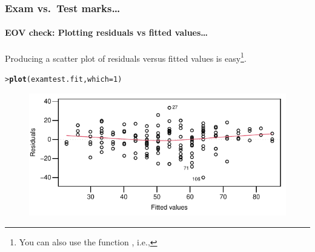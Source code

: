 \documentclass{beamer}\usepackage[]{graphicx}\usepackage[]{xcolor}
\makeatletter
\newcommand{\hlnum}[1]{\textcolor[rgb]{0.686,0.059,0.569}{#1}}%
\newcommand{\hlstd}[1]{\textcolor[rgb]{0.345,0.345,0.345}{#1}}%
\newcommand{\hlkwc}[1]{\textcolor[rgb]{0.333,0.667,0.333}{#1}}%
\newcommand{\hlkwd}[1]{\textcolor[rgb]{0.737,0.353,0.396}{\textbf{#1}}}%
\newenvironment{kframe}{%
 \def\at@end@of@kframe{}%
 \ifinner\ifhmode%
  \def\at@end@of@kframe{\end{minipage}}%
  \begin{minipage}{\columnwidth}%
 \fi\fi%
 \def\FrameCommand##1{\hskip\@totalleftmargin \hskip-\fboxsep
 \colorbox{shadecolor}{##1}\hskip-\fboxsep
     \hskip-\linewidth \hskip-\@totalleftmargin \hskip\columnwidth}%
 \MakeFramed {\advance\hsize-\width
   \@totalleftmargin\z@ \linewidth\hsize
   \@setminipage}}%
 {\par\unskip\endMakeFramed%
 \at@end@of@kframe}
\newenvironment{knitrout}{}{} %
\makeatother
\begin{document}
\begin{frame}[fragile]
\frametitle{Exam vs.\ Test marks\ldots}
\framesubtitle{EOV check: Plotting residuals vs fitted values\ldots}
Producing a scatter plot of residuals versus fitted values is easy\footnote{You can also use
the  function , i.e., }. 

\begin{knitrout}\scriptsize
{}\color{fgcolor}\begin{kframe}
\begin{alltt}
\hlstd{> }\hlkwd{plot}\hlstd{(examtest.fit,} \hlkwc{which}\hlstd{=}\hlnum{1}\hlstd{)}
\end{alltt}
\end{kframe}
\end{knitrout}



\begin{figure}
  \centering
  \includegraphics{figure/RC-H02-009}
\end{figure}

\end{frame}
\end{document}
